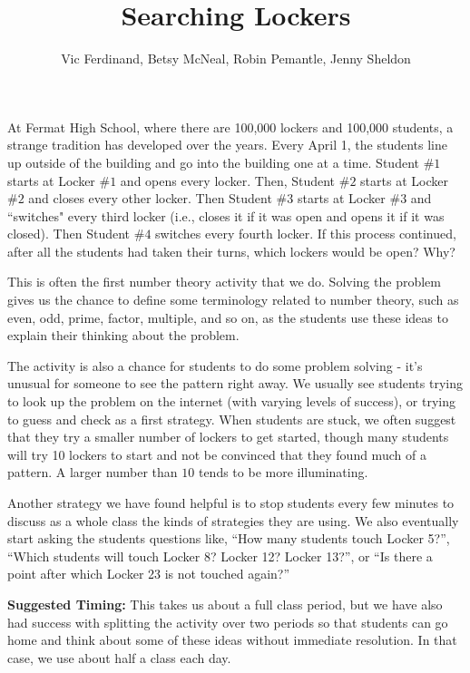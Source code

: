 \documentclass[nooutcomes]{ximera}
\title{Searching Lockers}
\author{Vic Ferdinand, Betsy McNeal, Robin Pemantle, Jenny Sheldon}
\begin{document}
\begin{abstract} \end{abstract}
\maketitle


\begin{problem}
At Fermat High School, where there are 100,000 lockers and 100,000 students, a strange tradition has developed over the years.  Every April 1, the students line up outside of the building and go into the building one at a time.  Student $\#1$ starts at Locker $\#1$ and opens every locker.  Then, Student $\#2$ starts at Locker $\#2$  and closes every other locker.  Then Student $\#3$ starts at Locker $\#3$ and ``switches" every third locker (i.e., closes it if it was open and opens it if it was closed).  Then Student $\#4$ switches every fourth locker.  If this process continued, after all the students had taken their turns, which lockers would be open?  Why?
\end{problem}
\newpage

\begin{instructorNotes}
This is often the first number theory activity that we do.  Solving the problem gives us the chance to define some terminology related to number theory, such as even, odd, prime, factor, multiple, and so on, as the students use these ideas to explain their thinking about the problem.

The activity is also a chance for students to do some problem solving - it's unusual for someone to see the pattern right away.  We usually see students trying to look up the problem on the internet (with varying levels of success), or trying to guess and check as a first strategy.  When students are stuck, we often suggest that they try a smaller number of lockers to get started, though many students will try 10 lockers to start and not be convinced that they found much of a pattern.  A larger number than $10$ tends to be more illuminating.

Another strategy we have found helpful is to stop students every few minutes to discuss as a whole class the kinds of strategies they are using.  We also eventually start asking the students questions like, ``How many students touch Locker 5?'', ``Which students will touch Locker 8? Locker 12?  Locker 13?'', or ``Is there a point after which Locker 23 is not touched again?''

{\bf Suggested Timing:} This takes us about a full class period, but we have also had success with splitting the activity over two periods so that students can go home and think about some of these ideas without immediate resolution.  In that case, we use about half a class each day.
\end{instructorNotes}
\end{document}
